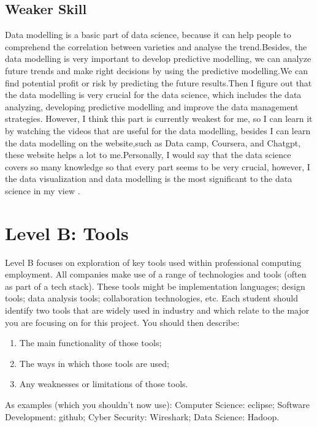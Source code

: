 \documentclass[a4paper, 11pt]{report}
\begin{document}
\subsection{Weaker Skill}
	Data modelling is a basic part of data science, because it can help people to comprehend the correlation between varieties and analyse the trend.Besides, the data modelling is very important to develop predictive modelling, we can analyze future trends and make right decisions by using the predictive modelling.We can find potential profit or risk by predicting the future results.Then I figure out that the data modelling is very crucial for the data science, which includes the data analyzing, developing predictive modelling and improve the data management strategies. However, I think this part is currently weakest for me, so I can learn it by watching the videos that are useful for the data modelling, besides I can learn the data modelling on the website,such as Data camp, Coursera, and Chatgpt, these website helps a lot to me.Personally, I would say that the data science covers so many knowledge so that every part seems to be very crucial, however, I the data visualization and data modelling is the most significant to the data science in my view .

\newpage
\section{Level B: Tools}
	
Level B focuses on exploration of key tools used within professional computing employment. All companies make use of a range of technologies and tools (often as part of a tech stack). These tools might be implementation languages; design tools; data analysis tools; collaboration technologies, etc. Each student should identify two tools that are widely used in industry and which relate to the major you are focusing on for this project. You should then describe:
\begin{enumerate}
	\item The main functionality of those tools;
	\item The ways in which those tools are used;
	\item Any weaknesses or limitations of those tools.
\end{enumerate}
	
As examples (which you shouldn't now use): Computer Science: eclipse; Software Development: github; Cyber Security: Wireshark; Data Science: Hadoop.
	
\end{document}
